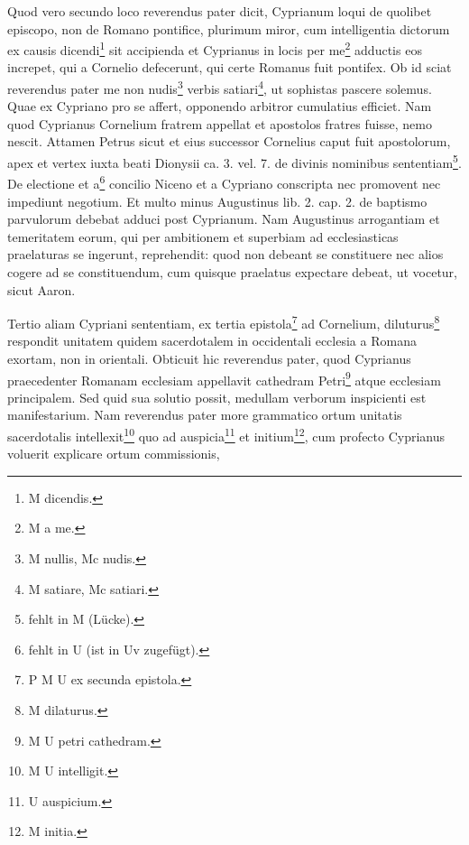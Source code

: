 Quod vero secundo loco reverendus pater dicit, Cyprianum loqui de quolibet episcopo, non de Romano pontifice, plurimum miror, cum intelligentia dictorum ex causis dicendi\footnote{M dicendis.} sit accipienda et Cyprianus in locis per me\footnote{M a me.} adductis eos increpet, qui a Cornelio defecerunt, qui certe Romanus fuit pontifex. Ob id sciat reverendus pater me non nudis\footnote{M nullis, Mc nudis.} verbis satiari\footnote{M satiare, Mc satiari.}, ut sophistas pascere solemus. Quae ex Cypriano pro se affert, opponendo arbitror cumulatius efficiet. Nam quod Cyprianus Cornelium fratrem appellat et apostolos fratres fuisse, nemo nescit. Attamen Petrus sicut et eius successor Cornelius caput fuit apostolorum, apex et vertex iuxta beati Dionysii ca. 3. vel. 7. de divinis nominibus sententiam\footnote{fehlt in M (Lücke).}. De electione et a\footnote{fehlt in U (ist in Uv zugefügt).} concilio Niceno et a Cypriano conscripta nec promovent nec impediunt negotium. Et multo minus Augustinus lib. 2. cap. 2. de baptismo parvulorum debebat adduci post Cyprianum. Nam Augustinus arrogantiam et temeritatem eorum, qui per ambitionem et superbiam ad ecclesiasticas praelaturas se ingerunt, reprehendit: quod non debeant se constituere nec alios cogere ad se constituendum, cum quisque praelatus expectare debeat, ut vocetur, sicut Aaron.

Tertio aliam Cypriani sententiam, ex tertia epistola\footnote{P M U ex secunda epistola.} ad Cornelium, diluturus\footnote{M dilaturus.} respondit unitatem quidem sacerdotalem in occidentali ecclesia a Romana exortam, non in orientali. Obticuit hic reverendus pater, quod Cyprianus praecedenter Romanam ecclesiam appellavit cathedram Petri\footnote{M U petri cathedram.} atque ecclesiam principalem. Sed quid sua solutio possit, medullam verborum inspicienti est manifestarium. Nam reverendus pater more grammatico ortum unitatis sacerdotalis intellexit\footnote{M U intelligit.} quo ad auspicia\footnote{U auspicium.} et initium\footnote{M initia.}, cum profecto Cyprianus voluerit explicare ortum commissionis,
